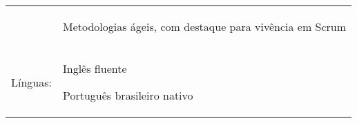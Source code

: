 \documentclass[a4paper,12pt]{article}
\begin{document}
\begin{tabular}{rp{15.2cm}}
& \begin{itemize*}[label=\Large\textbullet]
    \item Metodologias ágeis, com destaque para vivência em Scrum
\end{itemize*}\\
\raggedleft Línguas:
& \begin{itemize*}[label=\Large\textbullet]
    \item Inglês fluente
    \item Português brasileiro nativo
\end{itemize*}\\
\end{tabular}
\end{document}
